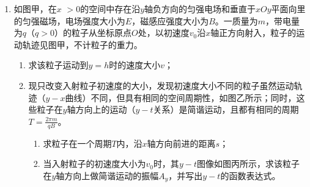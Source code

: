 \begin{enumerate}[leftmargin=0em]
\newpage
\item
{}
如图甲，在$ x $ $ >0 $的空间中存在沿$ y $轴负方向的匀强电场和垂直于$ xOy $平面向里的匀强磁场，电场强度大小为$ E $，磁感应强度大小为$ B $。一质量为$ m $，带电量为$ q $（$ q>0 $）的粒子从坐标原点$ O $处，以初速度$ v_{0} $沿$ x $轴正方向射入，粒子的运动轨迹见图甲，不计粒子的重力。
\begin{enumerate}
\renewcommand{\labelenumi}{\arabic{enumi}.}
\item
求该粒子运动到$ y=h $时的速度大小$ v $；
\item 
现只改变入射粒子初速度的大小，发现初速度大小不同的粒子虽然运动轨迹（$ y-x $曲线）不同，但具有相同的空间周期性，如图乙所示；同时，这些粒子在$ y $轴方向上的运动（$ y-t $关系）是简谐运动，且都有相同的周期$T = \frac { 2 \pi m } { q B }$。
\begin{enumerate}
\renewcommand{\labelenumiii}{\roman{enumiii}}
\item
求粒子在一个周期$ T $内，沿$ x $轴方向前进的距离$ s $；
\item 
当入射粒子的初速度大小为$ v_{0} $时，其$ y-t $图像如图丙所示，求该粒子在$ y $轴方向上做简谐运动的振幅$ A_y $，并写出$ y-t $的函数表达式。


\end{enumerate}


\end{enumerate}
\begin{figure}[h!]
\flushright

\end{figure}

\end{enumerate}
